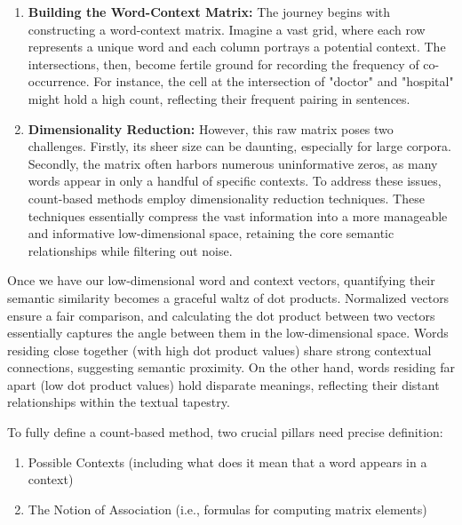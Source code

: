 \documentclass{report}
\begin{document}
\begin{enumerate}
\item \textbf{Building the Word-Context Matrix:} The journey begins with constructing a word-context matrix. Imagine a vast grid, where each row represents a unique word and each column portrays a potential context. The intersections, then, become fertile ground for recording the frequency of co-occurrence. For instance, the cell at the intersection of "doctor" and "hospital" might hold a high count, reflecting their frequent pairing in sentences.

\item \textbf{Dimensionality Reduction:} However, this raw matrix poses two challenges. Firstly, its sheer size can be daunting, especially for large corpora. Secondly, the matrix often harbors numerous uninformative zeros, as many words appear in only a handful of specific contexts. To address these issues, count-based methods employ dimensionality reduction techniques. These techniques essentially compress the vast information into a more manageable and informative low-dimensional space, retaining the core semantic relationships while filtering out noise.
\end{enumerate}

Once we have our low-dimensional word and context vectors, quantifying their semantic similarity becomes a graceful waltz of dot products. Normalized vectors ensure a fair comparison, and calculating the dot product between two vectors essentially captures the angle between them in the low-dimensional space. Words residing close together (with high dot product values) share strong contextual connections, suggesting semantic proximity. On the other hand, words residing far apart (low dot product values) hold disparate meanings, reflecting their distant relationships within the textual tapestry.

To fully define a count-based method, two crucial pillars need precise definition:
\begin{enumerate}
	\item Possible Contexts (including what does it mean that a word appears in a context)
\item The Notion of Association (i.e., formulas for computing matrix elements)
\end{enumerate}
\end{document}
